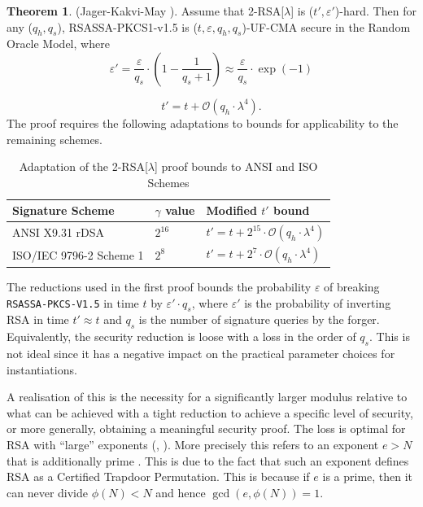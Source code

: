 \documentclass[]{final_report}
\theoremstyle{definition}
\newtheorem{theorem}{Theorem}
\begin{document}
\begin{theorem}
(Jager-Kakvi-May \cite{jager2018security}). Assume that 2-RSA[\(\lambda\)] is (\(t', \varepsilon'\))-hard. Then for any (\(q_h, q_s\)), RSASSA-PKCS1-v1.5 is (\(t, \varepsilon, q_h, q_s\))-UF-CMA secure in the Random Oracle Model, where
\[
\varepsilon' = \frac{\varepsilon}{q_s} \cdot \left(1 - \frac{1}{q_s + 1}\right) \approx \frac{\varepsilon}{q_s} \cdot \exp(-1)
\]

\[
t' = t + \mathcal{O}(q_h \cdot \lambda^4).
\]
The proof requires the following adaptations to bounds for applicability to the remaining schemes.
\begin{table}[H]
\centering
\caption{Adaptation of the 2-RSA[\(\lambda\)] proof bounds to ANSI and ISO Schemes}
\begin{tabular}{|m{4.38cm}|m{1.5cm}|m{4.5cm}|}
\hline
\textbf{Signature Scheme} & \textbf{$\gamma$ value} & \textbf{Modified $t'$ bound} \\ \hline
ANSI X9.31 rDSA               & \( 2^{16} \)     & \( t' = t + 2^{15} \cdot \mathcal{O}(q_h \cdot \lambda^4) \)     \\ \hline
ISO/IEC 9796-2 Scheme 1        & \( 2^{8} \)       & \( t' = t + 2^7 \cdot \mathcal{O}(q_h \cdot \lambda^4) \)       \\ \hline
\end{tabular}
\label{table:rsaAdap}
\end{table}
\end{theorem}

The reductions used in the first proof bounds the probability \( \varepsilon \) of breaking \texttt{RSASSA-PKCS-V1.5} in time \( t \) by \( \varepsilon' \cdot q_s \), where \( \varepsilon' \) is the probability of inverting RSA in time \( t' \approx t \) and \( q_s \) is the number of signature queries by the forger. Equivalently, the security reduction is loose with a loss in the order of \( q_s \). This is not ideal since it has a negative impact on the practical parameter choices for instantiations. 

A realisation of this is the necessity for a significantly larger modulus relative to what can be achieved with a tight reduction to achieve a specific level of security, or more generally, obtaining a meaningful security proof. The loss is optimal for RSA with “large” exponents (\cite{10.1007/3-540-46035-7_18}, \cite{kakvi2018optimal}). More precisely this refers to an exponent \( e > N \) that is additionally prime \cite{10.1007/3-540-48910-X_28, 10.1007/978-3-540-24676-3_5}. This is due to the fact that such an exponent defines RSA as a Certified Trapdoor Permutation. This is because if \( e \) is a prime, then it can never divide \( \phi(N) < N \) and hence \( \gcd(e, \phi(N)) = 1 \). 
\end{document}
